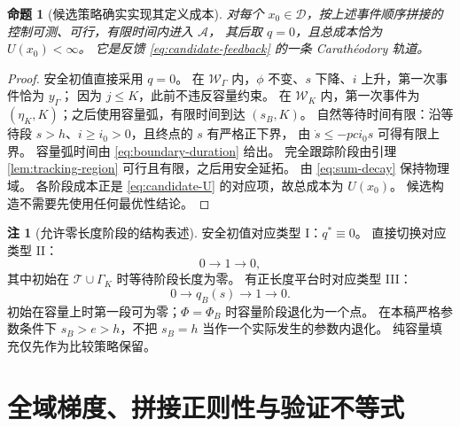 \documentclass[11pt,a4paper,UTF8]{ctexart}
\newtheorem{proposition}[theorem]{命题}
\theoremstyle{definition}
\newtheorem{remark}[theorem]{注}
\newcommand{\Acal}{\mathcal A}
\newcommand{\Dcal}{\mathcal D}
\begin{document}
\begin{proposition}[候选策略确实实现其定义成本]
\label{prop:candidate-attainment}
对每个 $x_0\in\Dcal$，按上述事件顺序拼接的控制可测、可行，有限时间内进入 $\Acal$，
其后取 $q=0$，且总成本恰为 $U(x_0)<\infty$。
它是反馈 \eqref{eq:candidate-feedback} 的一条 Carath\'eodory 轨道。
\end{proposition}
\begin{proof}
安全初值直接采用 $q=0$。
在 $\mathcal W_\Gamma$ 内，$\phi$ 不变、$s$ 下降、$i$ 上升，第一次事件恰为 $y_\Gamma$；
因为 $j\le K$，此前不违反容量约束。
在 $\mathcal W_K$ 内，第一次事件为 $(\eta_K,K)$；之后使用容量弧，有限时间到达 $(s_B,K)$。
自然等待时间有限：沿等待段 $s>h$、$i\ge i_0>0$，且终点的 $s$ 有严格正下界，
由 $\dot s\le-pci_0s$ 可得有限上界。
容量弧时间由 \eqref{eq:boundary-duration} 给出。
完全跟踪阶段由引理\ref{lem:tracking-region} 可行且有限，之后用安全延拓。
由 \eqref{eq:sum-decay} 保持物理域。
各阶段成本正是 \eqref{eq:candidate-U} 的对应项，故总成本为 $U(x_0)$。
候选构造不需要先使用任何最优性结论。
\end{proof}

\begin{remark}[允许零长度阶段的结构表述]
安全初值对应类型 I：$q^*\equiv0$。
直接切换对应类型 II：
\begin{equation}
0\longrightarrow1\longrightarrow0,
\label{eq:direct-structure}
\end{equation}
其中初始在 $\mathcal T\cup\Gamma_K$ 时等待阶段长度为零。
有正长度平台时对应类型 III：
\begin{equation}
0\longrightarrow q_B(s)\longrightarrow1\longrightarrow0.
\label{eq:capacity-structure}
\end{equation}
初始在容量上时第一段可为零；$\Phi=\Phi_B$ 时容量阶段退化为一个点。
在本稿严格参数条件下 $s_B>e>h$，不把 $s_B=h$ 当作一个实际发生的参数内退化。
纯容量填充仅先作为比较策略保留。
\end{remark}

\section{全域梯度、拼接正则性与验证不等式}
\label{sec:verification-details}
\end{document}
